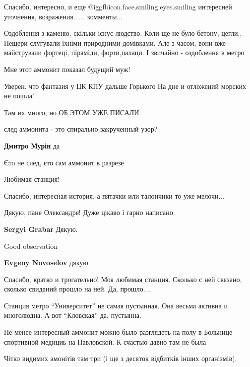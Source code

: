 \begin{itemize}
Спасибо, интересно, и еще @igg{fbicon.face.smiling.eyes.smiling} интересней уточнения, возражения...... комменты...


Оздоблення з каменю, скільки існує людство. Коли ще не було бетону, цегли..
Пещери слугували їхніми природними домівками. Але з часом, вони вже майстрували
фортеці, піраміди, форти,палаци. І звичайно - оздоблення в метро


Мне этот аммонит показал будущий муж!

Уверен, что фантазия у ЦК КПУ дальше Горького На дне и отложений морских не пошла!

Там их много, но ОБ ЭТОМ УЖЕ ПИСАЛИ.

след аммонита - это спирально закрученный узор?

\begin{itemize} %
\textbf{Дмитро Мурін} да

Єто не след, єто сам аммонит в разрезе
\end{itemize} %

Любимая станция!

Спасибо, интересная история, а пятачки или талончики то уже мелочи...

Дякую, пане Олександре! Дуже цікаво і гарно написано.

\textbf{Sergyi Grabar} Дякую.

Good observation

\textbf{Evgeny Novoselov} дякую


Спасибо, кратко и трогательно! Моя любимая станция. Сколько с ней связано,
сколько свиданий прошло на ней. Да, прошло....


Станция метро \enquote{Университет} не самая пустынная. Она весьма активна и многолюдна. А вот \enquote{Кловская} да, пустынна.

Не менее интересный аммонит можно было разглядеть на полу в Больнице спортивной медициь на Павловской. К счастью давно там не была

Чітко видимих амонітів там три (і ще з десяток відбитків інших організмів).


\end{itemize}
